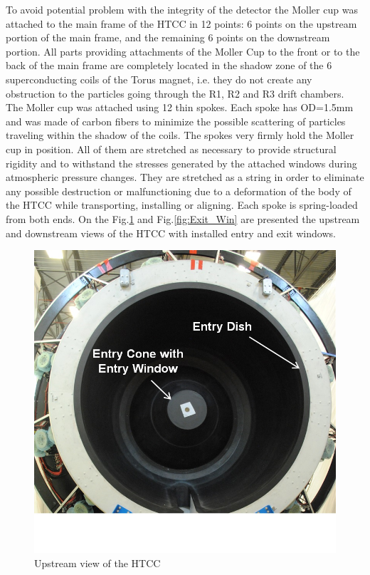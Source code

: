 To avoid potential problem with the integrity of the detector the Moller cup was attached to the main frame of the HTCC in 12 points: 6 points on the upstream portion of the main frame, and the remaining 6 points on the downstream portion. All parts providing attachments of the Moller Cup to the front or to the back of the main frame are completely located in the shadow zone of the 6 superconducting coils of the Torus magnet, i.e. they do not create any obstruction to the particles going through the R1, R2 and R3 drift chambers. The Moller cup was attached using 12 thin spokes. Each spoke has OD=1.5mm and was made of carbon fibers to minimize the possible scattering of particles traveling within the shadow of the coils. The spokes very firmly hold the Moller cup in position. All of them are stretched as necessary to provide structural rigidity and to withstand the stresses generated by the attached windows during atmospheric pressure changes. They are stretched as a string in order to eliminate any possible destruction or malfunctioning due to a deformation of the body of the HTCC while transporting, installing or aligning. Each spoke is spring-loaded from both ends. On the Fig.\ref{fig:Front_View} and Fig.\ref{fig:Exit_Win} are presented the upstream and downstream views of the HTCC with installed entry and exit windows.

\begin{figure}[h]
    \centering
    \includegraphics[width=1.0\linewidth,trim={0 2.5cm 0 0},clip]{images/Front_View}
    \caption{Upstream view of the HTCC}
    \label{fig:Front_View}
\end{figure}



